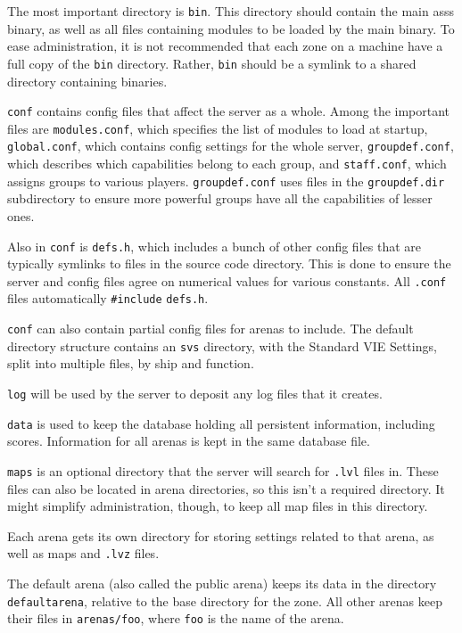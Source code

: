 \documentclass{article}
\newcommand{\asss}{asss}
\begin{document}
The most important directory is \verb/bin/. This directory should
contain the main \asss{} binary, as well as all files containing modules
to be loaded by the main binary. To ease administration, it is not
recommended that each zone on a machine have a full copy of the
\verb/bin/ directory. Rather, \verb/bin/ should be a symlink to a shared
directory containing binaries.

\verb/conf/ contains config files that affect the server as a whole.
Among the important files are \verb/modules.conf/, which specifies the
list of modules to load at startup, \verb/global.conf/, which contains
config settings for the whole server, \verb/groupdef.conf/, which
describes which capabilities belong to each group, and
\verb/staff.conf/, which assigns groups to various players.
\verb/groupdef.conf/ uses files in the \verb/groupdef.dir/ subdirectory
to ensure more powerful groups have all the capabilities of lesser ones.

Also in \verb/conf/ is \verb/defs.h/, which includes a bunch of other
config files that are typically symlinks to files in the source code
directory. This is done to ensure the server and config files agree on
numerical values for various constants. All \verb/.conf/ files
automatically \verb/#include/ \verb/defs.h/.

\verb/conf/ can also contain partial config files for arenas to include.
The default directory structure contains an \verb/svs/ directory, with
the Standard VIE Settings, split into multiple files, by ship and
function.

\verb/log/ will be used by the server to deposit any log files that it
creates.

\verb/data/ is used to keep the database holding all persistent
information, including scores. Information for all arenas is kept in the
same database file.

\verb/maps/ is an optional directory that the server will search for
\verb/.lvl/ files in. These files can also be located in arena
directories, so this isn't a required directory. It might simplify
administration, though, to keep all map files in this directory.

Each arena gets its own directory for storing settings related to that
arena, as well as maps and \verb/.lvz/ files.

The default arena (also called the public arena) keeps its data in the
directory \verb/defaultarena/, relative to the base directory for the
zone. All other arenas keep their files in \verb|arenas/foo|, where
\verb/foo/ is the name of the arena.
\end{document}
